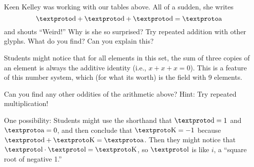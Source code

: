 \documentclass[nooutcomes,instructornotes]{ximera}
\begin{document}
\begin{problem} 
Keen Kelley was working with our tables above. All of a sudden, she
writes
\[
\loo + \loo + \loo = \lo
\]
and shouts ``Weird!'' Why is she so surprised? Try repeated addition
with other glyphs. What do you find? Can you explain this?
\begin{teachingnote}
Students might notice that for all elements in this set, the sum of three copies of an element is always the additive identity (i.e., $x + x + x = 0$).  This is a feature of this number system, which (for what its worth) is the field with 9 elements.  
\end{teachingnote}
\end{problem}


\begin{problem}
Can you find any other oddities of the arithmetic above? Hint: Try
repeated multiplication!
\begin{teachingnote}
One possibility: Students might use the shorthand that $\loo = 1$ and $\lo = 0$, and then conclude that $\ld = -1$ because $\loo+\ld=\lo$.  Then they might notice that $\lh\cdot \lh = \ld$, so $\lh$ is like $i$, a ``square root of negative 1.''
\end{teachingnote}
\end{problem}
\end{document}

